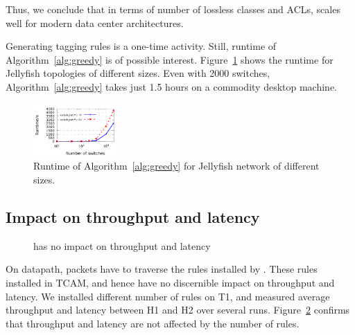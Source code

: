 Thus, we conclude that in terms of number of lossless classes and ACLs,
\sysname{} scales well for modern data center architectures.

Generating tagging rules is a one-time activity. Still, runtime of
Algorithm~\ref{alg:greedy} is of possible interest.
Figure~\ref{fig:algo_runtime} shows the runtime for Jellyfish topologies of
different sizes. Even with 2000 switches, Algorithm~\ref{alg:greedy} takes
just 1.5 hours on a commodity desktop machine.


\begin{figure}
	\centering
	\includegraphics[width=0.3\textwidth] {figs/algo_runtime}
	\caption{Runtime of Algorithm~\ref{alg:greedy} for Jellyfish network of different sizes.}
	\label{fig:algo_runtime}
	\vspace{-0.25in}
\end{figure}

\subsection{Impact on throughput and latency}\label{subsec:exp_performanceoverhead}

\begin{figure}[t]
	\centering
	
	
		\caption{\sysname{} has no impact on throughput and latency}
		\label{fig:perf_penalty}
\end{figure}

On datapath, packets have to traverse the rules installed by \sysname{}.  These
rules installed in TCAM, and hence have no discernible impact on throughput and
latency. We installed different number of \sysname{} rules on T1, and measured
average throughput and latency between H1 and H2 over several runs.
Figure~\ref{fig:perf_penalty} confirms that throughput and latency are not
affected by the number of rules.


